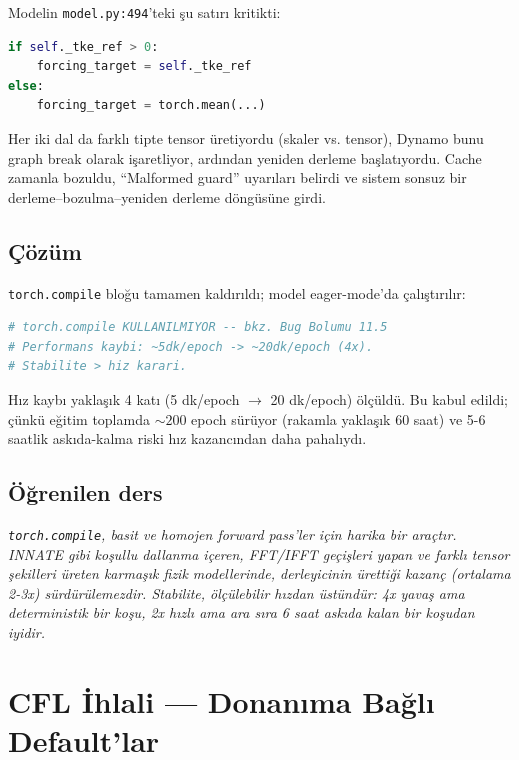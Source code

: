 Modelin \texttt{model.py:494}'teki şu satırı kritikti:
\begin{lstlisting}[language=Python]
if self._tke_ref > 0:
    forcing_target = self._tke_ref
else:
    forcing_target = torch.mean(...)
\end{lstlisting}

Her iki dal da farklı tipte tensor üretiyordu (skaler vs. tensor), Dynamo bunu graph break olarak işaretliyor, ardından yeniden derleme başlatıyordu. Cache zamanla bozuldu, ``Malformed guard'' uyarıları belirdi ve sistem sonsuz bir derleme--bozulma--yeniden derleme döngüsüne girdi.

\subsection*{Çözüm}

\texttt{torch.compile} bloğu tamamen kaldırıldı; model eager-mode'da çalıştırılır:

\begin{lstlisting}[language=Python,caption={Eager mode zorunlu}]
# torch.compile KULLANILMIYOR -- bkz. Bug Bolumu 11.5
# Performans kaybi: ~5dk/epoch -> ~20dk/epoch (4x).
# Stabilite > hiz karari.
\end{lstlisting}

Hız kaybı yaklaşık 4 katı (5 dk/epoch $\to$ 20 dk/epoch) ölçüldü. Bu kabul edildi; çünkü eğitim toplamda $\sim 200$ epoch sürüyor (rakamla yaklaşık 60 saat) ve 5-6 saatlik askıda-kalma riski hız kazancından daha pahalıydı.

\subsection*{Öğrenilen ders}

\begin{remark}
\textit{\texttt{torch.compile}, basit ve homojen forward pass'ler için harika bir araçtır. INNATE gibi koşullu dallanma içeren, FFT/IFFT geçişleri yapan ve farklı tensor şekilleri üreten karmaşık fizik modellerinde, derleyicinin ürettiği kazanç (ortalama 2-3x) sürdürülemezdir. Stabilite, ölçülebilir hızdan üstündür: 4x yavaş ama deterministik bir koşu, 2x hızlı ama ara sıra 6 saat askıda kalan bir koşudan iyidir.}
\end{remark}


\section{CFL İhlali --- Donanıma Bağlı Default'lar}
\label{sec:bug_cfl}


